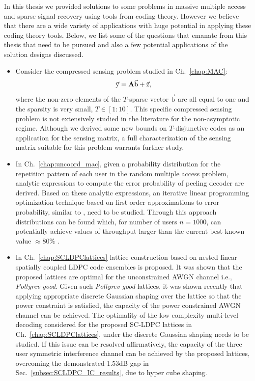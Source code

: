 In this thesis we provided solutions to some problems in massive multiple access and sparse signal recovery using tools from coding theory. However we believe that there are a wide variety of applications with huge potential in applying these coding theory tools. Below, we list some of the questions that emanate from this thesis that need to be pursued and also a few potential applications of the solution designs discussed.

\begin{itemize}
\item Consider the compressed sensing problem studied in Ch.~\ref{chap:MAC}:
\begin{align*}
\vec{\mathrm{y}}=\mathbf{A}\vec{\mathrm{b}}+\vec{\mathrm{z}},
\end{align*}
where the non-zero elements of the $T$-sparse vector $\vec{\mathrm{b}}$ are all equal to one and the sparsity is very small, $T\in[1:10]$. This specific compressed sensing problem is not extensively studied in the literature for the non-asymptotic regime. Although we derived some new bounds on $T$-disjunctive codes as an application for the sensing matrix, a full characterization of the sensing matrix suitable for this problem warrants further study.
\item In Ch.~\ref{chap:uncoord_mac}, given a probability distribution for the repetition pattern of each user in the random multiple access problem, analytic expressions to compute the error probability of peeling decoder are derived. Based on these analytic expressions, an iterative linear programming optimization technique based on first order approximations to error probability, similar to \cite{amraoui2007find}, need to be studied. Through this approach distributions can be found which, for number of users $n=1000$, can potentially achieve values of throughput larger than the current best known value $\approx 80\%$ .
\item In Ch.~\ref{chap:SCLDPClattices} lattice construction based on nested linear spatially coupled LDPC code ensembles is proposed. It	 was shown that the proposed lattices are optimal for the unconstrained AWGN channel i.e., \emph{Poltyrev-good}. Given such 
\emph{Poltyrev-good} lattices, it was shown recently \cite{ling2014achieving,yan2014construction} that applying appropriate discrete Gaussian shaping over the lattice so that the power constraint is satisfied, the capacity of the power constrained AWGN channel can be achieved. The optimality of the low complexity multi-level decoding considered for the proposed SC-LDPC lattices in Ch.~\ref{chap:SCLDPClattices}, under the discrete Gaussian shaping needs to be studied. If this issue can be resolved affirmatively, the capacity of the three user symmetric interference channel can be achieved by the proposed lattices, overcoming the demonstrated $1.53$dB gap in Sec.~\ref{subsec:SCLDPC_IC_results}, due to hyper cube shaping.

\end{itemize}
